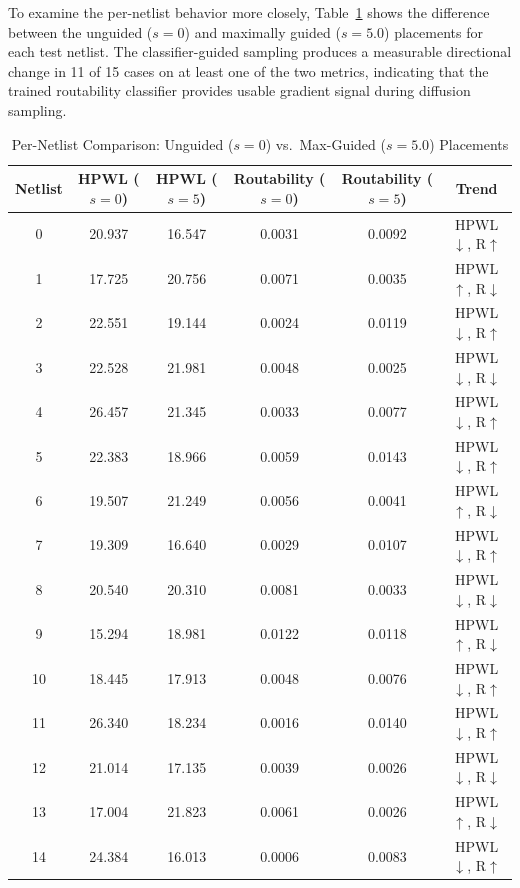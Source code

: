 \documentclass{ieeeaccess}
\begin{document}
To examine the per-netlist behavior more closely, Table~\ref{tab:per_netlist_extremes} shows the difference between the unguided ($s = 0$) and maximally guided ($s = 5.0$) placements for each test netlist. The classifier-guided sampling produces a measurable directional change in 11 of 15 cases on at least one of the two metrics, indicating that the trained routability classifier provides usable gradient signal during diffusion sampling.

\begin{table}[t]
\centering
\caption{Per-Netlist Comparison: Unguided ($s=0$) vs.\ Max-Guided ($s=5.0$) Placements}
\label{tab:per_netlist_extremes}
\setlength{\tabcolsep}{8pt}
\begin{tabular}{cccccc}
\toprule
Netlist & HPWL ($s{=}0$) & HPWL ($s{=}5$) & Routability ($s{=}0$) & Routability ($s{=}5$) & Trend \\
\midrule
0 & 20.937 & 16.547 & 0.0031 & 0.0092 & HPWL$\downarrow$, R$\uparrow$ \\
1 & 17.725 & 20.756 & 0.0071 & 0.0035 & HPWL$\uparrow$, R$\downarrow$ \\
2 & 22.551 & 19.144 & 0.0024 & 0.0119 & HPWL$\downarrow$, R$\uparrow$ \\
3 & 22.528 & 21.981 & 0.0048 & 0.0025 & HPWL$\downarrow$, R$\downarrow$ \\
4 & 26.457 & 21.345 & 0.0033 & 0.0077 & HPWL$\downarrow$, R$\uparrow$ \\
5 & 22.383 & 18.966 & 0.0059 & 0.0143 & HPWL$\downarrow$, R$\uparrow$ \\
6 & 19.507 & 21.249 & 0.0056 & 0.0041 & HPWL$\uparrow$, R$\downarrow$ \\
7 & 19.309 & 16.640 & 0.0029 & 0.0107 & HPWL$\downarrow$, R$\uparrow$ \\
8 & 20.540 & 20.310 & 0.0081 & 0.0033 & HPWL$\downarrow$, R$\downarrow$ \\
9 & 15.294 & 18.981 & 0.0122 & 0.0118 & HPWL$\uparrow$, R$\downarrow$ \\
10 & 18.445 & 17.913 & 0.0048 & 0.0076 & HPWL$\downarrow$, R$\uparrow$ \\
11 & 26.340 & 18.234 & 0.0016 & 0.0140 & HPWL$\downarrow$, R$\uparrow$ \\
12 & 21.014 & 17.135 & 0.0039 & 0.0026 & HPWL$\downarrow$, R$\downarrow$ \\
13 & 17.004 & 21.823 & 0.0061 & 0.0026 & HPWL$\uparrow$, R$\downarrow$ \\
14 & 24.384 & 16.013 & 0.0006 & 0.0083 & HPWL$\downarrow$, R$\uparrow$ \\
\bottomrule
\end{tabular}
\end{table}
\end{document}

